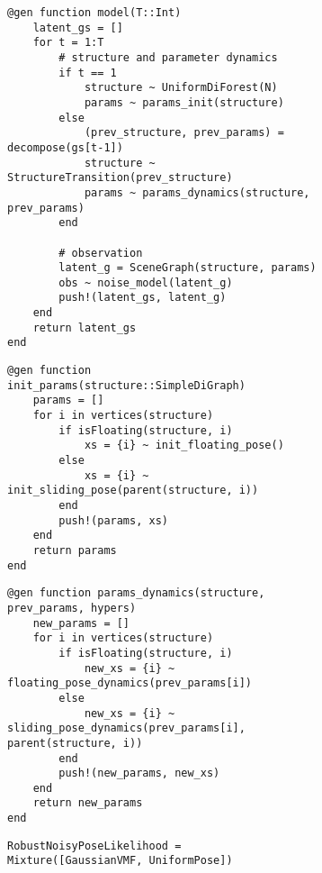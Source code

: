 \begin{figure}[p]
\centering
\begin{subfigure}{\textwidth}
\begin{lstlisting}
@gen function model(T::Int)
    latent_gs = []
    for t = 1:T
        # structure and parameter dynamics
        if t == 1
            structure ~ UniformDiForest(N)
            params ~ params_init(structure)
        else
            (prev_structure, prev_params) = decompose(gs[t-1])
            structure ~ StructureTransition(prev_structure)
            params ~ params_dynamics(structure, prev_params)
        end

        # observation
        latent_g = SceneGraph(structure, params)
        obs ~ noise_model(latent_g)
        push!(latent_gs, latent_g)
    end
    return latent_gs
end
\end{lstlisting}
\end{subfigure}

\begin{subfigure}{\textwidth}
\begin{lstlisting}
@gen function init_params(structure::SimpleDiGraph)
    params = []
    for i in vertices(structure)
        if isFloating(structure, i)
            xs = {i} ~ init_floating_pose()
        else
            xs = {i} ~ init_sliding_pose(parent(structure, i))
        end
        push!(params, xs)
    end
    return params
end
\end{lstlisting}
\end{subfigure}

\begin{subfigure}{\textwidth}
\begin{lstlisting}
@gen function params_dynamics(structure, prev_params, hypers)
    new_params = []
    for i in vertices(structure)
        if isFloating(structure, i)
            new_xs = {i} ~ floating_pose_dynamics(prev_params[i])
        else
            new_xs = {i} ~ sliding_pose_dynamics(prev_params[i], parent(structure, i))
        end
        push!(new_params, new_xs)
    end
    return new_params
end
\end{lstlisting}
\end{subfigure}

\begin{subfigure}{\textwidth}
\begin{lstlisting}
RobustNoisyPoseLikelihood = Mixture([GaussianVMF, UniformPose])


\end{lstlisting}
\end{subfigure}
\end{figure}
